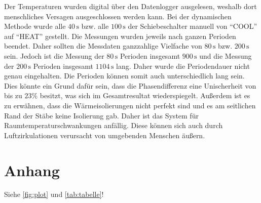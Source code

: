 Der Temperaturen wurden digital über den Datenlogger ausgelesen, weshalb dort menschliches Versagen ausgeschlossen werden kann.
Bei der dynamischen Methode wurde alle $40\,\unit{\second}$ bzw. alle $100\,\unit{\second}$ der Schiebeschalter manuell
von \enquote{COOL} auf \enquote{HEAT} gestellt. Die Messungen wurden jeweils nach ganzen Perioden beendet. Daher sollten die 
Messdaten ganzzahlige Vielfache von $80\,\unit{\second}$ bzw. $200\,\unit{\second}$ sein. Jedoch ist die Messung der 
$80\,\unit{\second}$ Perioden insgesamt $900\,\unit{\second}$ und die Messung der $200\,\unit{\second}$ Perioden insgesamt 
$1104\,\unit{\second}$ lang.
Daher wurde die Periodendauer nicht genau eingehalten. Die Perioden können somit auch unterschiedlich lang sein.
Dies könnte ein Grund dafür sein, dass die Phasendifferenz eine Unischerheit von bis zu $23{\%}$ besitzt, was sich im Gesamtresultat wiederspiegelt.
Außerdem ist es zu erwähnen, dass die Wärmeisolierungen nicht perfekt sind und es am seitlichen Rand der Stäbe keine
Isolierung gab. Daher ist das System für Raumtemperaturschwankungen anfällig. Diese können sich auch durch Luftzirkulationen 
verursacht von umgebenden Menschen äußern.


\section{Anhang}
Siehe \autoref{fig:plot} und \autoref{tab:tabelle}!


